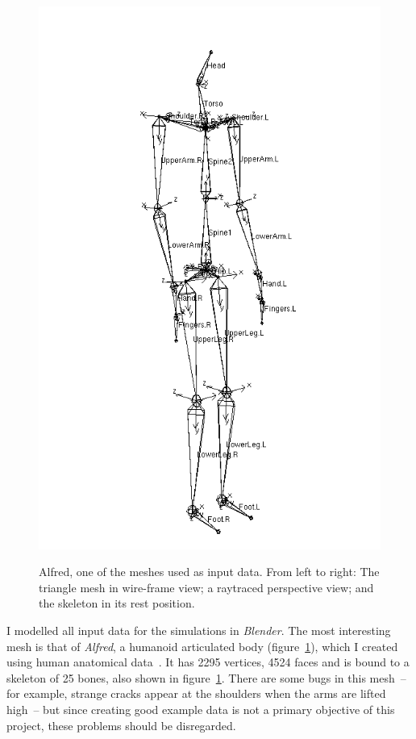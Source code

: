 \begin{figure}
{    \includegraphics{figures/alfred-skeleton}}
\caption{Alfred, one of the meshes used as input data. From left to right: The triangle mesh in
    wire-frame view; a raytraced perspective view; and the skeleton in its rest position.
    \label{alfredFigure}}
\end{figure}
I modelled all input data for the simulations in \textsl{Blender}. The most interesting mesh
is that of \emph{Alfred}, a humanoid articulated body (figure~\ref{alfredFigure}), which I created
using human anatomical data~\cite{Anatomy:03}. It has 2295 vertices, 4524 faces and is bound to
a skeleton of 25 bones, also shown in figure~\ref{alfredFigure}. There are some bugs in this
mesh~-- for example, strange cracks appear at the shoulders when the arms are lifted high~-- but
since creating good example data is not a primary objective of this project, these problems
should be disregarded.
